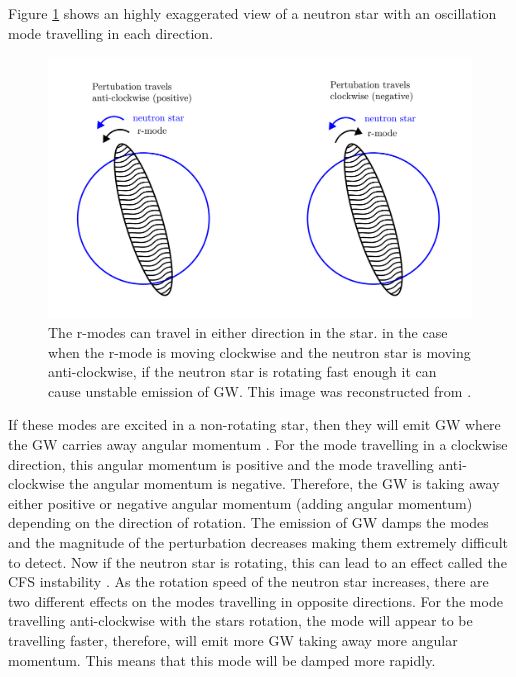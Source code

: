 
\if
Figure \ref{intro:source:cw:rmode} shows an highly exaggerated view of a neutron star with an oscillation mode travelling in each direction.
\begin{figure}[h]
	\centering
	\includegraphics[width=\textwidth]{C1_intro/rmode.pdf}
	\caption[Generating \glspl{GW} from r-modes in neutron stars.]{The r-modes can travel in either direction in the star. in the case when the r-mode is moving clockwise and the neutron star is moving anti-clockwise, if the neutron star is rotating fast enough it can cause unstable emission of \gls{GW}. This image was reconstructed from \citep{jonesCFSInstability}.}
	\label{intro:source:cw:rmode}
\end{figure}
If these modes are excited in a non-rotating star, then they will emit \gls{GW} where the \gls{GW}  carries away angular momentum \citep{jonesCFSInstability}. 
For the mode travelling in a clockwise direction, this angular momentum is positive and the mode travelling anti-clockwise the angular momentum is negative. 
Therefore, the \gls{GW} is taking away either positive or negative angular momentum (adding angular momentum) depending on the direction of rotation.
The emission of \gls{GW} damps the modes and the magnitude of the perturbation decreases making them extremely difficult to detect.
Now if the neutron star is rotating, this can lead to an effect called the \gls{CFS} instability  \citep{chandrasekhar1970SolutionsTwo,friedman1978SecularInstability}. 
As the rotation speed of the neutron star increases, there are two different effects on the modes travelling in opposite directions. 
For the mode travelling anti-clockwise with the stars rotation, the mode will appear to be travelling faster, therefore, will emit more \gls{GW} taking away more angular momentum. This means that this mode will be damped more rapidly.
